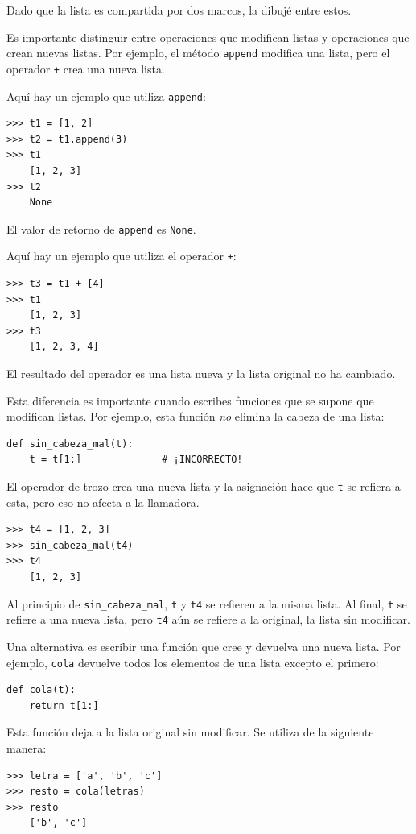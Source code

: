 \documentclass[10pt]{book}
\begin{document}
Dado que la lista es compartida por dos marcos, la dibujé
entre estos.

Es importante distinguir entre operaciones que
modifican listas y operaciones que crean nuevas listas.  Por
ejemplo, el método {\tt append} modifica una lista, pero el
operador {\tt +} crea una nueva lista.

Aquí hay un ejemplo que utiliza {\tt append}:
%
\begin{verbatim}
>>> t1 = [1, 2]
>>> t2 = t1.append(3)
>>> t1
    [1, 2, 3]
>>> t2
    None
\end{verbatim}
%
El valor de retorno de {\tt append} es {\tt None}.

Aquí hay un ejemplo que utiliza el operador {\tt +}:
%
\begin{verbatim}
>>> t3 = t1 + [4]
>>> t1
    [1, 2, 3]
>>> t3
    [1, 2, 3, 4]
\end{verbatim}
%
El resultado del operador es una lista nueva y la lista original no ha
cambiado.

Esta diferencia es importante cuando escribes funciones que
se supone que modifican listas.  Por ejemplo, esta función
{\em no} elimina la cabeza de una lista:
%
\begin{verbatim}
def sin_cabeza_mal(t):
    t = t[1:]              # ¡INCORRECTO!
\end{verbatim}
%
El operador de trozo crea una nueva lista y la asignación
hace que {\tt t} se refiera a esta, pero eso no afecta a la llamadora.
%
\begin{verbatim}
>>> t4 = [1, 2, 3]
>>> sin_cabeza_mal(t4)
>>> t4
    [1, 2, 3]
\end{verbatim}
%
Al principio de \verb"sin_cabeza_mal", {\tt t} y {\tt t4}
se refieren a la misma lista.  Al final, {\tt t} se refiere a una nueva lista,
pero {\tt t4} aún se refiere a la original, la lista sin modificar.

Una alternativa es escribir una función que cree y
devuelva una nueva lista.  Por
ejemplo, {\tt cola} devuelve todos los elementos
de una lista excepto el primero:

\begin{verbatim}
def cola(t):
    return t[1:]
\end{verbatim}
%
Esta función deja a la lista original sin modificar.
Se utiliza de la siguiente manera:

\begin{verbatim}
>>> letra = ['a', 'b', 'c']
>>> resto = cola(letras)
>>> resto
    ['b', 'c']
\end{verbatim}
\end{document}
